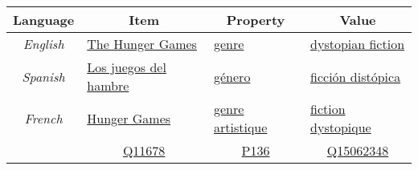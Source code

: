 \documentclass{standalone}
\begin{document}
\begin{tabular}{|c|l|l|l|}
    \hline
    \rowcolor[HTML]{EFEFEF}
    \textbf{Language}     & \multicolumn{1}{c|}{\cellcolor[HTML]{EFEFEF}\textbf{Item}}                              & \multicolumn{1}{c|}{\cellcolor[HTML]{EFEFEF}\textbf{Property}}                            & \multicolumn{1}{c|}{\cellcolor[HTML]{EFEFEF}\textbf{Value}}                             \\ \hline
    \textit{English}      & \multicolumn{1}{l|}{\href{https://www.wikidata.org/wiki/Q11678}{The Hunger Games}}      & \multicolumn{1}{l|}{\href{https://www.wikidata.org/wiki/Property:P136}{genre}}            & \multicolumn{1}{l|}{\href{https://www.wikidata.org/wiki/Q15062348}{dystopian fiction}}  \\ \hline
    \textit{Spanish}      & \multicolumn{1}{l|}{\href{https://www.wikidata.org/wiki/Q11678}{Los juegos del hambre}} & \multicolumn{1}{l|}{\href{https://www.wikidata.org/wiki/Property:P136}{género}}           & \multicolumn{1}{l|}{\href{https://www.wikidata.org/wiki/Q15062348}{ficción distópica}}  \\ \hline
    \textit{French}       & \multicolumn{1}{l|}{ \href{https://www.wikidata.org/wiki/Q11678}{Hunger Games}}         & \multicolumn{1}{l|}{\href{https://www.wikidata.org/wiki/Property:P136}{genre artistique}} & \multicolumn{1}{l|}{\href{https://www.wikidata.org/wiki/Q15062348}{fiction dystopique}} \\ \hline
    \multicolumn{1}{l|}{} & \multicolumn{1}{c|}{\href{https://www.wikidata.org/wiki/Q11678}{Q11678}}                & \multicolumn{1}{c|}{\href{https://www.wikidata.org/wiki/Property:P136}{P136}}             & \multicolumn{1}{c|}{\href{https://www.wikidata.org/wiki/Q15062348}{Q15062348} }         \\ \cline{2-4}
\end{tabular}
\end{document}
